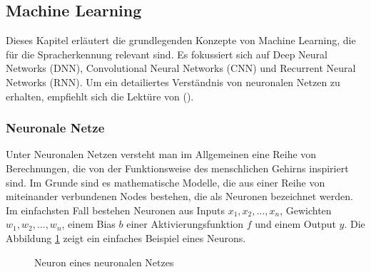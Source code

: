 \documentclass[11pt,a4paper]{article}
\begin{document}
\subsection{Machine Learning}
Dieses Kapitel erläutert die grundlegenden Konzepte von Machine Learning, die für die
Spracherkennung relevant sind. Es fokussiert sich auf Deep Neural Networks (DNN), Convolutional
Neural Networks (CNN) und Recurrent Neural Networks (RNN). Um ein detailiertes Verständnis von
neuronalen Netzen zu erhalten, empfiehlt sich die Lektüre von (\cite{weidman2019deep}).

\subsubsection{Neuronale Netze}
Unter Neuronalen Netzen versteht man im Allgemeinen eine Reihe von Berechnungen, die von der
Funktionsweise des menschlichen Gehirns inspiriert sind. Im Grunde sind es mathematische Modelle,
die aus einer Reihe von miteinander verbundenen Nodes bestehen, die als Neuronen bezeichnet werden.
Im einfachsten Fall bestehen Neuronen aus Inputs \(x_{1}, x_{2}, \dots, x_{n}\), Gewichten
\(w_{1}, w_{2}, \dots, w_{n}\), einem Bias \(b\) einer Aktivierungsfunktion \(f\) und einem Output
\(y\). Die Abbildung \ref{fig:neuron} zeigt ein einfaches Beispiel eines Neurons.

\begin{figure}[h]
	\centering

	\caption{Neuron eines neuronalen Netzes}
	\label{fig:neuron}

\end{figure}
\end{document}
